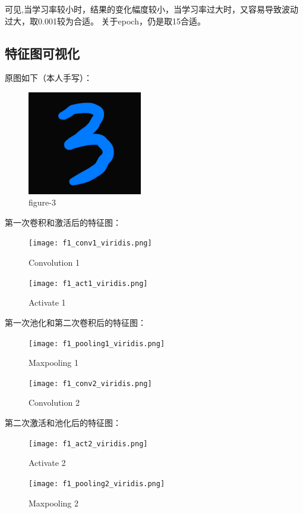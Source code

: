 \documentclass[12pt, a4paper, oneside]{ctexart}
\begin{document}
可见,当学习率较小时，结果的变化幅度较小，当学习率过大时，又容易导致波动过大，取0.001较为合适。
关于epoch，仍是取15合适。

\subsection{特征图可视化}
原图如下（本人手写）：
\begin{figure}[H]
    \centering
    \includegraphics[width=5cm]{test_3.jpg}
    \caption{figure-3}
\end{figure}
第一次卷积和激活后的特征图：
\begin{figure}[H]  
    \begin{minipage}[H]{0.5\linewidth} %
            \centering
            \texttt{[image: f1\_conv1\_viridis.png]}
            \caption{Convolution 1}
     \end{minipage}
     \begin{minipage}[H]{0.5\linewidth} %
         \hspace{2mm}%
         \texttt{[image: f1\_act1\_viridis.png]}
         \caption{Activate 1}
      \end{minipage}
\end{figure}
第一次池化和第二次卷积后的特征图：
\begin{figure}[H]  
    \begin{minipage}[H]{0.5\linewidth} %
            \centering
            \texttt{[image: f1\_pooling1\_viridis.png]}
            \caption{Maxpooling 1}
     \end{minipage}
     \begin{minipage}[H]{0.5\linewidth} %
         \hspace{2mm}%
         \texttt{[image: f1\_conv2\_viridis.png]}
         \caption{Convolution 2}
      \end{minipage}
\end{figure}
第二次激活和池化后的特征图：
\begin{figure}[H]  
    \begin{minipage}[H]{0.5\linewidth} %
            \centering
            \texttt{[image: f1\_act2\_viridis.png]}
            \caption{Activate 2}
     \end{minipage}
     \begin{minipage}[H]{0.5\linewidth} %
         \hspace{2mm}%
         \texttt{[image: f1\_pooling2\_viridis.png]}
         \caption{Maxpooling 2}
      \end{minipage}
\end{figure}
\end{document}
